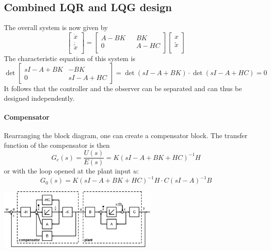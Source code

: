 \subsection{Combined LQR and LQG design}
The overall system is now given by
\[
    \begin{bmatrix}
        \dot{x} \\ \dot{\tilde{x}}\\
    \end{bmatrix} = 
    \begin{bmatrix}
        A-BK && BK \\
        0 && A-HC \\
    \end{bmatrix}
    \begin{bmatrix}
        x \\ \tilde{x} \\
    \end{bmatrix}
\]
The characteristic equation of this system is
\[
    \det\begin{bmatrix}
        sI - A + BK & -BK \\
        0 & sI - A + HC
    \end{bmatrix}
    =
    \det(sI - A + BK) \cdot \det(sI - A + HC) = 0
\]
It follows that the controller and the observer can be separated
and can thus be designed independently.

\vspace{1em}
\begin{minipage}{10cm}
    \paragraph{Compensator}Rearranging the block diagram, one can create
    a compensator block.
    The transfer function of the compensator is then
    \[
        G_c(s) = \frac{U(s)}{E(s)} = K(sI - A + BK + HC)^{-1} H
    \]
    or with the loop opened at the plant input $u$:
    \[
        G_0(s) = K(sI - A + BK + HC)^{-1} H \cdot C(sI - A)^{-1} B
    \]
\end{minipage}
\hspace{0.5cm}
\begin{minipage}{8cm}
    \centering
    \includegraphics[width=8cm]{bilder/statereg_comp.png}
\end{minipage}

